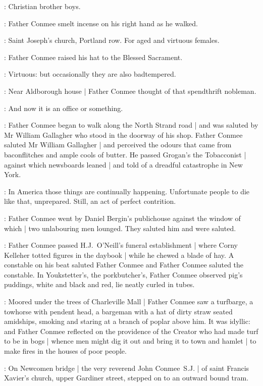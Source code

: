 \conmeeint:
Christian brother boys.

:
Father Conmee smelt incense on his right hand as he walked.

\conmeeint:
Saint Joseph's church, Portland row.
For aged and virtuous females.

:
Father Conmee raised his hat to the Blessed Sacrament.

\conmeeint:
Virtuous: but occasionally they are also badtempered.

:
Near Aldborough house |
Father Conmee thought of that spendthrift nobleman.

\conmeeint:
And now it is an office or something.

:
Father Conmee began to walk along the North Strand road |
and was saluted by Mr William Gallagher
who stood in the doorway of his shop.
Father Conmee saluted Mr William Gallagher |
and perceived the odours
that came from baconflitches and ample cools of butter.
He passed Grogan's the Tobacconist |
against which newsboards leaned |
and told of a dreadful catastrophe
in New York.

\conmeeint:
In America those things are continually happening.
Unfortunate people to die like that, unprepared.
Still, an act of perfect contrition.

:
Father Conmee went by Daniel Bergin's publichouse
against the window of which |
two unlabouring men lounged.
They saluted him and were saluted.

:
Father Conmee passed H.J.~O'Neill's funeral establishment |
where Corny Kelleher totted figures in the daybook |
while he chewed a blade of hay.
A constable on his beat saluted Father Conmee
and Father Conmee saluted the constable.
In Youkstetter's, the porkbutcher's,
Father Conmee observed pig's puddings,
white and black and red,
lie neatly curled in tubes.

:
Moored under the trees of Charleville Mall |
Father Conmee saw a turfbarge,
a towhorse with pendent head,
a bargeman with a hat of dirty straw seated amidships,
smoking and staring at a branch of poplar above him.
It was idyllic:
and Father Conmee reflected on the providence of the Creator
who had made turf to be in bogs |
whence men might dig it out and bring it to town and hamlet |
to make fires in the houses of poor people.

:
On Newcomen bridge |
the very reverend John Conmee~S.J. |
of saint Francis Xavier's church, upper Gardiner street,
stepped on to an outward bound tram.

